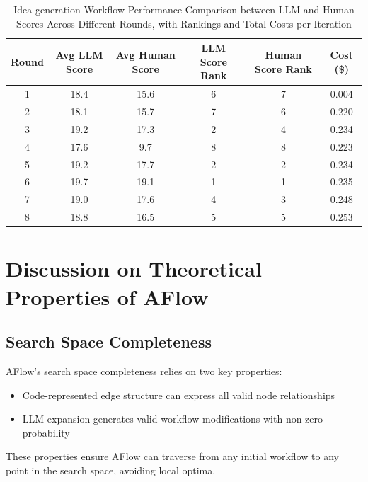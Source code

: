 \documentclass{article} %
\newcommand{\model}{{\sc AFlow}\xspace}
\theoremstyle{plain}
\theoremstyle{definition}
\theoremstyle{remark}
\begin{document}
\begin{table}[h]
\renewcommand\arraystretch{1.2}
\setlength{\arrayrulewidth}{0.8pt}
\setlength{\tabcolsep}{4pt}
\setlength{\abovecaptionskip}{0.1cm}
\setlength{\belowcaptionskip}{-0.2cm}
\centering
\begin{tabular*}{\textwidth}{@{\extracolsep{\fill}}cccccc@{}}  
\hline
Round & Avg LLM Score & Avg Human Score & LLM Score Rank & Human Score Rank & Cost (\$) \\
\hline
1 & 18.4 & 15.6 & 6 & 7 & 0.004 \\
2 & 18.1 & 15.7 & 7 & 6 & 0.220 \\
3 & 19.2 & 17.3 & 2 & 4 & 0.234 \\
4 & 17.6 & 9.7  & 8 & 8 & 0.223 \\
5 & 19.2 & 17.7 & 2 & 2 & 0.234 \\
6 & 19.7 & 19.1 & 1 & 1 & 0.235 \\
7 & 19.0 & 17.6 & 4 & 3 & 0.248 \\
8 & 18.8 & 16.5 & 5 & 5 & 0.253 \\
\hline
\end{tabular*}
\caption{Idea generation Workflow Performance Comparison between LLM and Human Scores Across Different Rounds, with Rankings and Total Costs per Iteration}
\label{tab:idea-workflow-performance}
\end{table}


\section{Discussion on Theoretical Properties of AFlow}
\label{appendix:theroy}

\subsection{Search Space Completeness}
\model's search space completeness relies on two key properties:
\begin{itemize}[leftmargin=20pt]
\item Code-represented edge structure can express all valid node relationships
\item LLM expansion generates valid workflow modifications with non-zero probability
\end{itemize}
These properties ensure \model can traverse from any initial workflow to any point in the search space, avoiding local optima.
\end{document}
